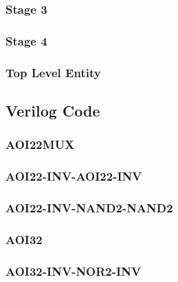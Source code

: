 \documentclass[conference]{IEEEtran}
\begin{document}
  \subsubsection{Stage 3} \hspace{1mm}
  
  \newpage
  \subsubsection{Stage 4} \hspace{1mm}
  
  \newpage
  \subsubsection{Top Level Entity} \hspace{1mm}
  
  \newpage




\newpage
\subsection{Verilog Code}
\label{sec:VerilogCode}
  \subsubsection{AOI22MUX} \hspace{1mm}
  
  \newpage
  \subsubsection{AOI22-INV-AOI22-INV} \hspace{1mm}
  
  \newpage
  \subsubsection{AOI22-INV-NAND2-NAND2} \hspace{1mm}
  
  \newpage
  \subsubsection{AOI32}
  
  \newpage
  \subsubsection{AOI32-INV-NOR2-INV} \hspace{1mm}
  
  \newpage
\end{document}
